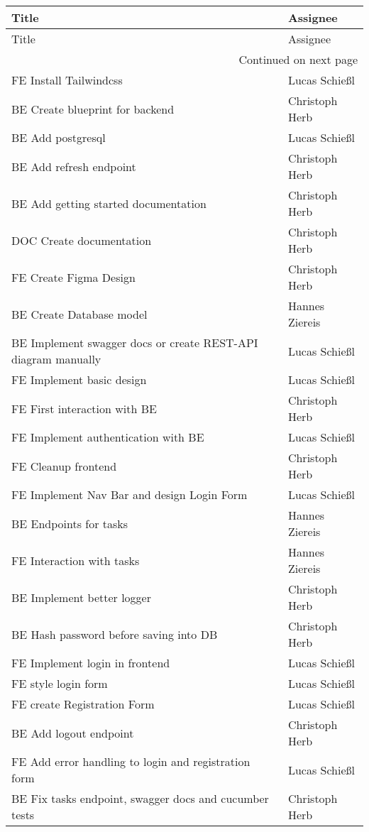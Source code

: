 \begin{longtable}{ll}
\label{GitLab Issues} \\
\toprule
Title & Assignee \\
\midrule
\endfirsthead
\toprule
Title & Assignee \\
\midrule
\endhead
\midrule
\multicolumn{2}{r}{Continued on next page} \\
\midrule
\endfoot
\bottomrule
\endlastfoot
FE Install Tailwindcss & Lucas Schießl \\
BE Create blueprint for backend & Christoph Herb \\
BE Add postgresql & Lucas Schießl \\
BE Add refresh endpoint & Christoph Herb \\
BE Add getting started documentation & Christoph Herb \\
DOC Create documentation & Christoph Herb \\
FE Create Figma Design & Christoph Herb \\
BE Create Database model & Hannes Ziereis \\
BE Implement swagger docs or create REST-API diagram manually & Lucas Schießl \\
FE Implement basic design & Lucas Schießl \\
FE First interaction with BE & Christoph Herb \\
FE Implement authentication with BE & Lucas Schießl \\
FE Cleanup frontend & Christoph Herb \\
FE Implement Nav Bar and design Login Form & Lucas Schießl \\
BE Endpoints for tasks & Hannes Ziereis \\
FE Interaction with tasks & Hannes Ziereis \\
BE Implement better logger & Christoph Herb \\
BE Hash password before saving into DB & Christoph Herb \\
FE Implement login in frontend & Lucas Schießl \\
FE style login form & Lucas Schießl \\
FE create Registration Form & Lucas Schießl \\
BE Add logout endpoint & Christoph Herb \\
FE Add error handling to login and registration form & Lucas Schießl \\
BE Fix tasks endpoint, swagger docs and cucumber tests & Christoph Herb \\

\end{longtable}
